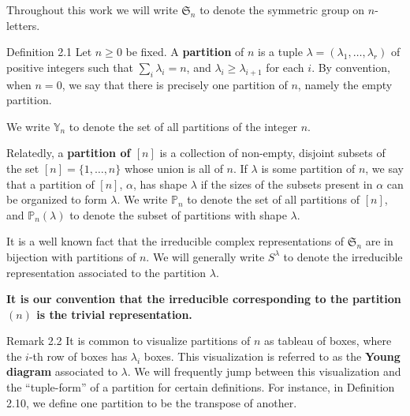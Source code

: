 Throughout this work we will write $\mathfrak{S}_n$ to denote the symmetric group on $n$-letters.
\begin{sourceblock}{Definition 2.1}
Let $n\geq 0$ be fixed. A \textbf{partition} of $n$ is a tuple $\lambda=(\lambda_1,\ldots,\lambda_r)$ of positive integers such that $\sum_i\lambda_i=n$, and $\lambda_i\geq\lambda_{i+1}$ for each $i$. By convention, when $n=0$, we say that there is precisely one partition of $n$, namely the empty partition.

We write $\mathbb{Y}_n$ to denote the set of all partitions of the integer $n$.

Relatedly, a \textbf{partition of $[n]$} is a collection of non-empty, disjoint subsets of the set $[n]=\{1,\ldots,n\}$ whose union is all of $n$. If $\lambda$ is some partition of $n$, we say that a partition of $[n]$, $\alpha$, has shape $\lambda$ if the sizes of the subsets present in $\alpha$ can be organized to form $\lambda$. We write $\mathbb{P}_n$ to denote the set of all partitions of $[n]$, and $\mathbb{P}_n(\lambda)$ to denote the subset of partitions with shape $\lambda$.
\end{sourceblock}
It is a well known fact that the irreducible complex representations of $\mathfrak{S}_n$ are in bijection with partitions of $n$. We will generally write $S^\lambda$ to denote the irreducible representation associated to the partition $\lambda$.

\textbf{It is our convention that the irreducible corresponding to the partition $(n)$ is the trivial representation.}

\begin{sourceblockroman}{Remark 2.2}
It is common to visualize partitions of $n$ as tableau of boxes, where the $i$-th row of boxes has $\lambda_i$ boxes. This visualization is referred to as the \textbf{Young diagram} associated to $\lambda$. We will frequently jump between this visualization and the ``tuple-form'' of a partition for certain definitions. For instance, in Definition 2.10, we define one partition to be the transpose of another.
\end{sourceblockroman}

